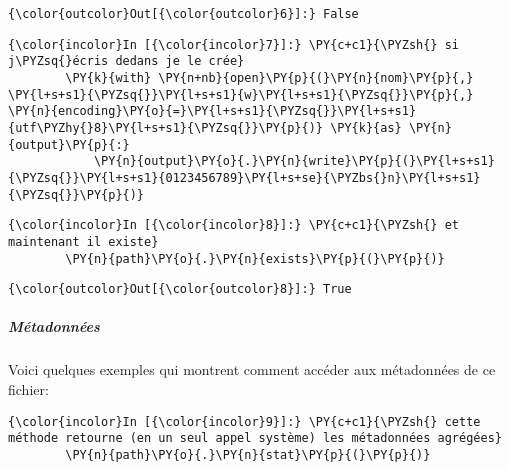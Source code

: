 \begin{Verbatim}[commandchars=\\\{\},frame=single,framerule=0.3mm,rulecolor=\color{cellframecolor}]
{\color{outcolor}Out[{\color{outcolor}6}]:} False
\end{Verbatim}
            
    \begin{Verbatim}[commandchars=\\\{\},frame=single,framerule=0.3mm,rulecolor=\color{cellframecolor}]
{\color{incolor}In [{\color{incolor}7}]:} \PY{c+c1}{\PYZsh{} si j\PYZsq{}écris dedans je le crée}
        \PY{k}{with} \PY{n+nb}{open}\PY{p}{(}\PY{n}{nom}\PY{p}{,} \PY{l+s+s1}{\PYZsq{}}\PY{l+s+s1}{w}\PY{l+s+s1}{\PYZsq{}}\PY{p}{,} \PY{n}{encoding}\PY{o}{=}\PY{l+s+s1}{\PYZsq{}}\PY{l+s+s1}{utf\PYZhy{}8}\PY{l+s+s1}{\PYZsq{}}\PY{p}{)} \PY{k}{as} \PY{n}{output}\PY{p}{:}
            \PY{n}{output}\PY{o}{.}\PY{n}{write}\PY{p}{(}\PY{l+s+s1}{\PYZsq{}}\PY{l+s+s1}{0123456789}\PY{l+s+se}{\PYZbs{}n}\PY{l+s+s1}{\PYZsq{}}\PY{p}{)}
\end{Verbatim}


    \begin{Verbatim}[commandchars=\\\{\},frame=single,framerule=0.3mm,rulecolor=\color{cellframecolor}]
{\color{incolor}In [{\color{incolor}8}]:} \PY{c+c1}{\PYZsh{} et maintenant il existe}
        \PY{n}{path}\PY{o}{.}\PY{n}{exists}\PY{p}{(}\PY{p}{)}
\end{Verbatim}


\begin{Verbatim}[commandchars=\\\{\},frame=single,framerule=0.3mm,rulecolor=\color{cellframecolor}]
{\color{outcolor}Out[{\color{outcolor}8}]:} True
\end{Verbatim}
            
    \hypertarget{muxe9tadonnuxe9es}{%
\subparagraph{Métadonnées}\label{muxe9tadonnuxe9es}}

    Voici quelques exemples qui montrent comment accéder aux métadonnées de
ce fichier:

    \begin{Verbatim}[commandchars=\\\{\},frame=single,framerule=0.3mm,rulecolor=\color{cellframecolor}]
{\color{incolor}In [{\color{incolor}9}]:} \PY{c+c1}{\PYZsh{} cette méthode retourne (en un seul appel système) les métadonnées agrégées}
        \PY{n}{path}\PY{o}{.}\PY{n}{stat}\PY{p}{(}\PY{p}{)}
\end{Verbatim}


